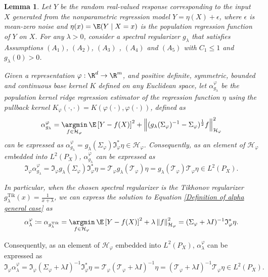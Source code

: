 \documentclass{article} %
\newcommand{\I}{\mathfrak{I}}
\newcommand{\rep}{\varphi}
\newcommand{\Hrep}{\mathcal{H}_{\varphi}}
\newcommand{\Srep}{\Sigma_{\rep}}
\newcommand{\Sreplambdainv}{(\Srep+\lambda I)^{-1}}
\newcommand{\Trep}{\mathcal{T}_{\rep}}
\newcommand{\Treplambdainv}{(\Trep+\lambda I)^{-1}}
\newcommand{\Irep}{\I_{\rep}}
\newcommand{\Irepad}{\Irep^{*}}
\newcommand{\gl}{g_{\lambda}}
\newcommand{\glTik}{\gl^{\operatorname{Tik}}}
\newcommand{\norm}[1]{\left\|#1\right\|}
\newcommand{\LPtwo}{L^{2}(P_{X})}
\newcommand{\SpectralAssumptionone}{A_{1}}
\newcommand{\SpectralAssumptiontwo}{A_{2}}
\newcommand{\SpectralAssumptionthree}{A_{3}}
\newcommand{\SpectralAssumptionfour}{A_{4}}
\newcommand{\SpectralAssumptionfive}{A_{5}}
\theoremstyle{plain}
\newcounter{lemmano}
\newtheorem{lemma}[lemmano]{Lemma}
\begin{document}
\begin{lemma}\label{Regularized regression solution}
 Let $Y$ be the random real-valued response corresponding to the input $X$ generated from the nonparametric regression model $Y=\eta(X) + \epsilon$, where $\epsilon$ is mean-zero noise and $\eta(x) = \E(Y \mid X = x)$ is the population regression function of $Y$ on $X$. For any $\lambda>0$, consider a spectral regularizer $\gl$ that satisfies Assumptions \hyperref[Assumption Spectral Regularizer A1]{$(\SpectralAssumptionone)$}, \hyperref[Assumption Spectral Regularizer A2]{$(\SpectralAssumptiontwo)$}, \hyperref[Assumption Spectral Regularizer A3]{$(\SpectralAssumptionthree)$} , \hyperref[Assumption Spectral Regularizer A4]{$(\SpectralAssumptionfour)$} and \hyperref[Assumption Spectral Regularizer A5]{$(\SpectralAssumptionfive)$} with $C_1 \leq 1$ and $\gl(0)>0$.
 
 Given a representation $\rep : \R^d \to \R^m$, and positive definite, symmetric, bounded and continuous base kernel $K$ defined on any Euclidean space, let $\alpha_{\gl}^{\rep}$ be the population kernel ridge regression estimator of the regression function $\eta$ using the pullback kernel $K_{\rep}(\cdot,\cdot) = K(\rep(\cdot),\rep(\cdot))$, defined as 
\begin{equation}\label{Definition of alpha general case}
    \alpha_{\gl}^{\rep} = \underset{f \in \Hrep}{\argmin} \hspace{2pt} \E\left[Y-f(X)\right]^{2} + \norm{(\gl(\Srep)^{-1} - \Srep)^{\frac{1}{2}}f}_{\Hrep}^{2}
\end{equation}
can be expressed as $\alpha_{\gl}^{\rep} = \gl(\Srep) \Irepad \eta \in \Hrep$. Consequently, as an element of $\Hrep$ embedded into $\LPtwo$, $\alpha_{\gl}^{\rep}$ can be expressed as \begin{equation}\label{Expression of alpha general case}
\Irep \alpha_{\gl}^{\rep} = \Irep \gl(\Srep) \Irepad \eta =\Trep \gl(\Trep) \eta =  \gl(\Trep) \Trep \eta \in \LPtwo.
\end{equation}

In particular, when the chosen spectral regularizer is the Tikhonov regularizer $\glTik(x) = \frac{1}{x+\lambda}$, we can express the solution to Equation \ref{Definition of alpha general case} as
\begin{equation}\label{Definition of alpha Tikhonov}
    \alpha_{\lambda}^{\rep} \coloneq \alpha_{\glTik} = \underset{f \in \Hrep}{\argmin} \hspace{2pt} \E\left[Y-f(X)\right]^{2} + \lambda \norm{f}_{\Hrep}^{2} = \Sreplambdainv \Irepad\eta .
\end{equation}
\end{lemma}
 Consequently, as an element of $\Hrep$ embedded into $\LPtwo$, $\alpha_{\lambda}^{\rep}$ can be expressed as \begin{equation}\label{Expression of alpha Tikhonov}\Irep \alpha_{\lambda}^{\rep} = \Irep \Sreplambdainv \Irepad \eta =\Trep \Treplambdainv \eta =   \Treplambdainv \Trep \eta \in \LPtwo.
 \end{equation}
\end{document}
